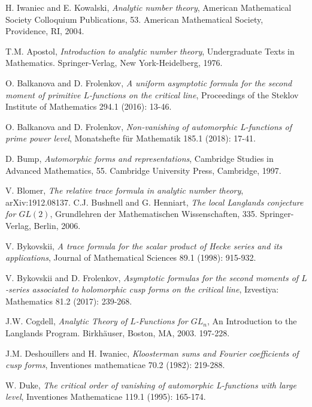 \documentclass[11pt,reqno]{amsart}
\theoremstyle{definition}
\begin{document}
\begin{thebibliography}{100}

H. Iwaniec and E. Kowalski, {\it Analytic number theory},
American Mathematical Society Colloquium Publications, 53.
American Mathematical Society, Providence, RI, 2004.

T.M. Apostol, {\it Introduction to analytic number theory},
Undergraduate Texts in Mathematics. Springer-Verlag, New York-Heidelberg, 1976.

 O. Balkanova and D. Frolenkov, {\it A uniform asymptotic formula for the second moment of primitive $L$-functions on the critical line},
    Proceedings of the Steklov Institute of Mathematics 294.1 (2016): 13-46.

 O. Balkanova and D. Frolenkov, {\it Non-vanishing of automorphic L-functions of prime power level},
    Monatshefte f\"ur Mathematik 185.1 (2018): 17-41.


D. Bump, {\it Automorphic forms and representations}, Cambridge Studies in Advanced Mathematics, 55. Cambridge University Press, Cambridge, 1997.


V. Blomer,
{\it The relative trace formula in analytic number theory},
arXiv:1912.08137.
C.J. Bushnell and G. Henniart,
{\it The local Langlands conjecture for $GL(2)$},
Grundlehren der Mathematischen Wissenschaften, 335. Springer-Verlag, Berlin, 2006.

 V. Bykovskii, {\it A trace formula for the scalar product of Hecke series and its applications}, Journal of Mathematical Sciences 89.1 (1998): 915-932.

V. Bykovskii and D. Frolenkov, {\it Asymptotic formulas for the second moments of
$L$-series associated to holomorphic cusp forms on the critical line}, Izvestiya: Mathematics 81.2 (2017): 239-268.



J.W. Cogdell, {\it Analytic Theory of $L$-Functions for $GL_n$},
An Introduction to the Langlands Program. Birkh\"auser, Boston, MA, 2003. 197-228.


J.M. Deshouillers and H. Iwaniec, {\it Kloosterman sums and Fourier coefficients of cusp forms}, Inventiones mathematicae 70.2 (1982): 219-288.


W. Duke, {\it The critical order of vanishing of automorphic L-functions with large level}, Inventiones Mathematicae 119.1 (1995): 165-174.



\end{thebibliography}
\end{document}
